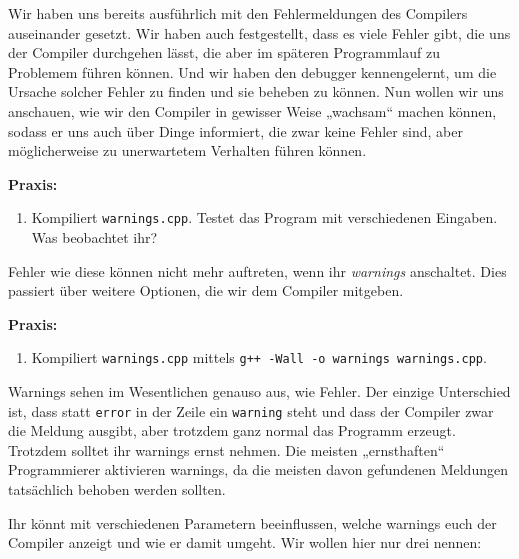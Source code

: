 
Wir haben uns bereits ausführlich mit den Fehlermeldungen des Compilers
auseinander gesetzt. Wir haben auch festgestellt, dass es viele Fehler gibt,
die uns der Compiler durchgehen lässt, die aber im späteren Programmlauf zu
Problemem führen können. Und wir haben den debugger kennengelernt, um die
Ursache solcher Fehler zu finden und sie beheben zu können. Nun wollen wir uns
anschauen, wie wir den Compiler in gewisser Weise „wachsam“ machen können,
sodass er uns auch über Dinge informiert, die zwar keine Fehler sind, aber
möglicherweise zu unerwartetem Verhalten führen können.

\textbf{Praxis:}
\begin{enumerate}
    \item Kompiliert \texttt{warnings.cpp}. Testet das Program mit
          verschiedenen Eingaben. Was beobachtet ihr?
\end{enumerate}

Fehler wie diese können nicht mehr auftreten, wenn ihr \emph{warnings}
anschaltet. Dies passiert über weitere Optionen, die wir dem Compiler mitgeben.

\textbf{Praxis:}
\begin{enumerate}[resume]
    \item Kompiliert \texttt{warnings.cpp} mittels \texttt{g++ -Wall -o
              warnings warnings.cpp}.
\end{enumerate}

Warnings sehen im Wesentlichen genauso aus, wie Fehler. Der einzige Unterschied
ist, dass statt \texttt{error} in der Zeile ein \texttt{warning} steht und dass
der Compiler zwar die Meldung ausgibt, aber trotzdem ganz normal das Programm
erzeugt. Trotzdem solltet ihr warnings ernst nehmen. Die meisten „ernsthaften“
Programmierer aktivieren warnings, da die meisten davon gefundenen Meldungen
tatsächlich behoben werden sollten.

Ihr könnt mit verschiedenen Parametern beeinflussen, welche warnings euch der
Compiler anzeigt und wie er damit umgeht. Wir wollen hier nur drei nennen:

